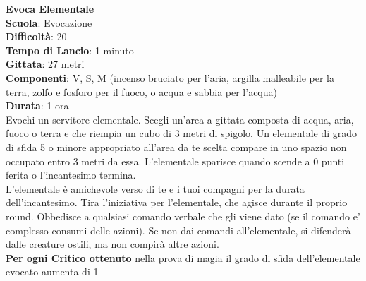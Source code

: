\begin{multicols}{2}
\medskip\textbf{Evoca Elementale}\\
\textbf{Scuola}: Evocazione\\
\textbf{Difficoltà}: 20\\
\textbf{Tempo di Lancio}: 1 minuto\\
\textbf{Gittata}: 27 metri\\
\textbf{Componenti}: V, S, M (incenso bruciato per l'aria, argilla malleabile per la terra, zolfo e fosforo per il fuoco, o acqua e sabbia per l'acqua) \\
\textbf{Durata}: 1 ora\\
Evochi un servitore elementale. Scegli un'area a gittata composta di acqua, aria, fuoco o terra e che riempia un cubo di 3 metri di spigolo. Un elementale di grado di sfida 5 o minore appropriato all'area da te scelta compare in uno spazio non occupato entro 3 metri da essa. L'elementale sparisce quando scende a 0 punti ferita o l'incantesimo termina.\\
L'elementale è amichevole verso di te e i tuoi compagni per la durata dell'incantesimo. Tira l'iniziativa per l'elementale, che agisce durante il proprio round. Obbedisce a qualsiasi comando verbale che gli viene dato (se il comando e' complesso consumi delle azioni). Se non dai comandi all'elementale, si difenderà dalle creature ostili, ma non compirà altre azioni.\\
\textbf{Per ogni Critico ottenuto} nella prova di magia il grado di sfida dell'elementale evocato aumenta di 1


\end{multicols}

